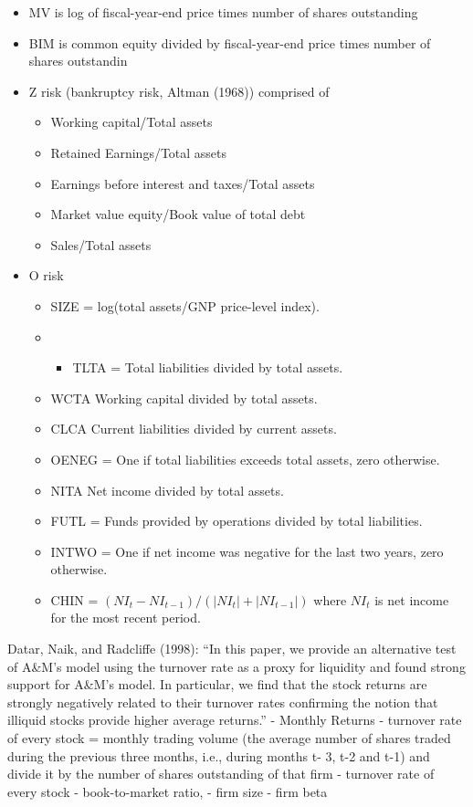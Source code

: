 \documentclass[
  letterpaper,
  DIV=11,
  numbers=noendperiod]{scrreprt}
\providecommand{\tightlist}{%
  \setlength{\itemsep}{0pt}\setlength{\parskip}{0pt}}\usepackage{longtable,booktabs,array}
\begin{document}
\begin{itemize}
\tightlist
\item
  MV is log of fiscal-year-end price times number of shares outstanding
\item
  BIM is common equity divided by fiscal-year-end price times number of
  shares outstandin
\item
  Z risk (bankruptcy risk, Altman (1968)) comprised of

  \begin{itemize}
  \tightlist
  \item
    Working capital/Total assets
  \item
    Retained Earnings/Total assets
  \item
    Earnings before interest and taxes/Total assets
  \item
    Market value equity/Book value of total debt
  \item
    Sales/Total assets
  \end{itemize}
\item
  O risk

  \begin{itemize}
  \item
    SIZE = log(total assets/GNP price-level index).
  \item
    \begin{itemize}
    \tightlist
    \item
      TLTA = Total liabilities divided by total assets.
    \end{itemize}
  \item
    WCTA Working capital divided by total assets.
  \item
    CLCA Current liabilities divided by current assets.
  \item
    OENEG = One if total liabilities exceeds total assets, zero
    otherwise.
  \item
    NITA Net income divided by total assets.
  \item
    FUTL = Funds provided by operations divided by total liabilities.
  \item
    INTWO = One if net income was negative for the last two years, zero
    otherwise.
  \item
    CHIN = \(({NI}_t-{NI}_{t-1})/(|{NI}_t| + |{NI}_{t-1}|)\) where
    \({NI}_t\) is net income for the most recent period.
  \end{itemize}
\end{itemize}

Datar, Naik, and Radcliffe (1998): ``In this paper, we provide an
alternative test of A\&M's model using the turnover rate as a proxy for
liquidity and found strong support for A\&M's model. In particular, we
find that the stock returns are strongly negatively related to their
turnover rates confirming the notion that illiquid stocks provide higher
average returns.'' - Monthly Returns - turnover rate of every stock =
monthly trading volume (the average number of shares traded during the
previous three months, i.e., during months t- 3, t-2 and t-1) and divide
it by the number of shares outstanding of that firm - turnover rate of
every stock - book-to-market ratio, - firm size - firm beta
\end{document}
